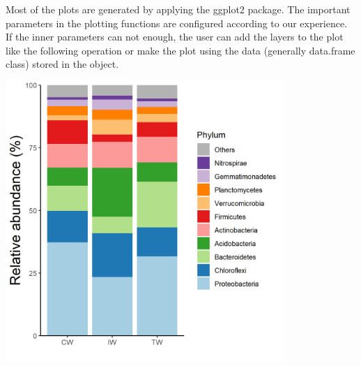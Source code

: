 \documentclass[
]{book}
\newenvironment{Shaded}{\begin{snugshade}}{\end{snugshade}}
\newcommand{\AttributeTok}[1]{\textcolor[rgb]{0.77,0.63,0.00}{#1}}
\newcommand{\ConstantTok}[1]{\textcolor[rgb]{0.00,0.00,0.00}{#1}}
\newcommand{\DecValTok}[1]{\textcolor[rgb]{0.00,0.00,0.81}{#1}}
\newcommand{\FunctionTok}[1]{\textcolor[rgb]{0.00,0.00,0.00}{#1}}
\newcommand{\NormalTok}[1]{#1}
\newcommand{\OtherTok}[1]{\textcolor[rgb]{0.56,0.35,0.01}{#1}}
\newcommand{\SpecialCharTok}[1]{\textcolor[rgb]{0.00,0.00,0.00}{#1}}
\newcommand{\StringTok}[1]{\textcolor[rgb]{0.31,0.60,0.02}{#1}}
\begin{document}
Most of the plots are generated by applying the ggplot2 package.
The important parameters in the plotting functions are configured according to our experience.
If the inner parameters can not enough, the user can add the layers to the plot like the following operation or
make the plot using the data (generally data.frame class) stored in the object.

\begin{Shaded}
\end{Shaded}

\begin{center}\includegraphics[width=400px]{Images/plot_bar_mean_classic} \end{center}
\end{document}
